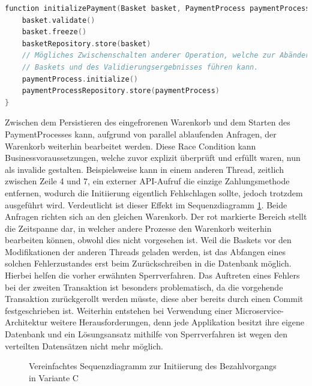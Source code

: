 \begin{minipage}{\linewidth} %
	\begin{lstlisting}[caption={Getrennte Transaktionen für die Initiierung des Bezahlvorgangs}, label={lst:eventualConsistency}, language=Kotlin]
function initializePayment(Basket basket, PaymentProcess paymentProcess) {
	basket.validate()
	basket.freeze()
	basketRepository.store(basket)
	// Mögliches Zwischenschalten anderer Operation, welche zur Abänderung des
	// Baskets und des Validierungsergebnisses führen kann.
	paymentProcess.initialize()
	paymentProcessRepository.store(paymentProcess)
}
	\end{lstlisting}
\end{minipage}

Zwischen dem Persistieren des eingefrorenen Warenkorb und dem Starten des PaymentProcesses kann, aufgrund von parallel ablaufenden Anfragen, der Warenkorb weiterhin bearbeitet werden. Diese \Gls{Race Condition} kann Businessvoraussetzungen, welche zuvor explizit überprüft und erfüllt waren, nun als invalide gestalten. Beispielsweise kann in einem anderen Thread, zeitlich zwischen Zeile 4 und 7, ein externer API-Aufruf die einzige Zahlungsmethode entfernen, wodurch die Initiierung eigentlich Fehlschlagen sollte, jedoch trotzdem ausgeführt wird. Verdeutlicht ist dieser Effekt im Sequenzdiagramm \ref{fig:VarC-Sequence-Alt}. Beide Anfragen richten sich an den gleichen Warenkorb. Der rot markierte Bereich stellt die Zeitspanne dar, in welcher andere Prozesse den Warenkorb weiterhin bearbeiten können, obwohl dies nicht vorgesehen ist. Weil die Baskets vor den Modifikationen der anderen Threads geladen werden, ist das Abfangen eines solchen Fehlerzustandes erst beim Zurückschreiben in die Datenbank möglich. Hierbei helfen die vorher erwähnten Sperrverfahren. Das Auftreten eines Fehlers bei der zweiten Transaktion ist besonders problematisch, da die vorgehende Transaktion zurückgerollt werden müsste, diese aber bereits durch einen Commit festgeschrieben ist. Weiterhin entstehen bei Verwendung einer Microservice-Architektur weitere Herausforderungen, denn jede Applikation besitzt ihre eigene Datenbank und ein Lösungsansatz mithilfe von Sperrverfahren ist wegen den verteilten Datensätzen nicht mehr möglich.

\begin{figure}[htbp]
	\centering
	
	\caption{Vereinfachtes Sequenzdiagramm zur Initiierung des Bezahlvorgangs in Variante C}
	\label{fig:VarC-Sequence-Alt}
\end{figure}

